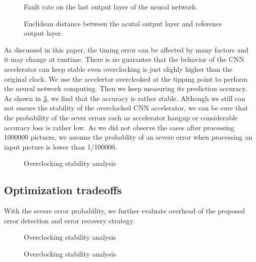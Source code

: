 \begin{figure}
    \caption{Fault rate on the last output layer of the neural network.}
\label{fig:cuowulv}
\vspace{-1em}
\end{figure}

\begin{figure}
    \caption{Euclidean distance between the acutal output layer and reference output layer.}
\label{fig:oushijuli}
\vspace{-1em}
\end{figure}

As discussed in this paper, the timing error can be affected by many factors and it may change 
at runtime. There is no guarantee that the behavior of the CNN accelerator can keep stable even 
overclocking is just slighly higher than the original clock. We use the accelertor overclcoked at the 
tipping point to perform the neural network computing. Then we keep measuring its 
prediction accuracy. As shown in \ref{fig:stability}, we find that the accuracy is rather stable.
Although we still can not ensure the stability of the overclocked CNN accelerator, we can 
be sure that the probability of the sever errors such as accelerator hangup or considerable 
accuracy loss is rather low. As we did not observe the cases after processing 1000000 pictuers, 
we assume the probablity of an severe error when processing an input picture is lower than 1/100000.
\begin{figure}
    \caption{Overclocking stability analysis}
\label{fig:stability}
\vspace{-1em}
\end{figure}


\subsection{Optimization tradeoffs}
With the severe error probability, we further evaluate overhead of 
the proposed error detection and error recovery strategy.

\begin{figure}
    \caption{Overclocking stability analysis}
\label{fig:time_consume}
\vspace{-1em}
\end{figure}

\begin{figure}
    \caption{Overclocking stability analysis}
\label{fig:time_consume}
\vspace{-1em}
\end{figure}


